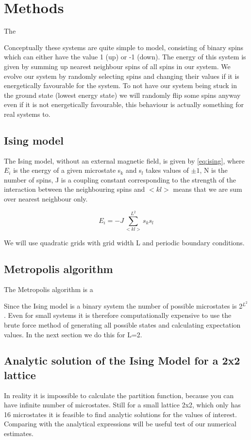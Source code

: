 \section{Methods}

The

Conceptually these systems are quite simple to model,
consisting of binary spins which can either have the value 1 (up) or -1 (down).
The energy of this system is given by summing up nearest neighbour spins of all
spins in our system. We evolve our system by randomly selecting spins and
changing their values if it is energetically favourable for the system. To not
have our system being stuck in the ground state (lowest energy state) we will randomly flip some spins
anyway even if it is not energetically favourable, this behaviour is actually
something for real systems to.
\subsection{Ising model}
The Ising model, without an external magnetic field, is given by
\cref{eq:ising}, where $E_i$ is the energy of a given microstate s$_k$ and s$_l$ takes values of $\pm 1$, N is the
number of spins, J is a coupling constant corresponding to the strength of the
interaction between the neighbouring spins and $<kl>$ means that we are sum over
nearest neighbour only.

\begin{equation}
  \label{eq:ising}
  E_i = -J\sum_{<kl>}^{L^2} s_k s_l
\end{equation}

We will
use quadratic grids with grid width L and periodic
boundary conditions.



\subsection{Metropolis algorithm}

The Metropolis algorithm is a



Since the Ising model is a binary system the number of possible microstates is
2$^{L^2}$. Even for small systems it is therefore computationally expensive to use
the brute force method of generating all possible states and calculating
expectation values. In the next section we do this for L=2.

\subsection{Analytic solution of the Ising Model for a 2x2 lattice}
In reality it is impossible to calculate the partition function, because you can
have infinite number of microstates. Still for a small lattice 2x2, which only
has 16 microstates it is
feasible to find analytic solutions for the values of
interest. Comparing with the analytical expressions will be useful test of our
numerical estimates.

